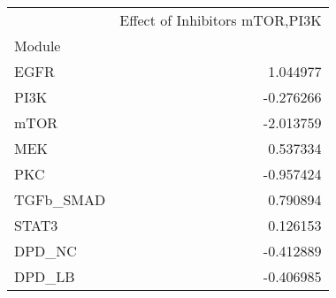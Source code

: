 \begin{tabular}{lr}
\toprule
{} &  Effect of Inhibitors mTOR,PI3K \\
Module    &                                 \\
\midrule
EGFR      &                        1.044977 \\
PI3K      &                       -0.276266 \\
mTOR      &                       -2.013759 \\
MEK       &                        0.537334 \\
PKC       &                       -0.957424 \\
TGFb\_SMAD &                        0.790894 \\
STAT3     &                        0.126153 \\
DPD\_NC    &                       -0.412889 \\
DPD\_LB    &                       -0.406985 \\
\bottomrule
\end{tabular}
